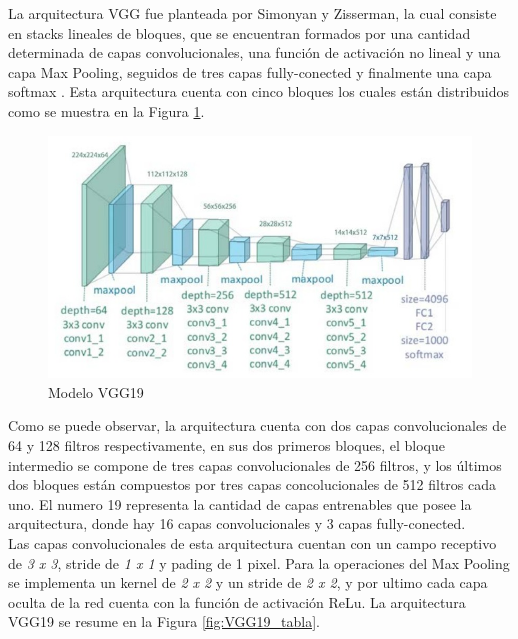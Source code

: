 				La arquitectura VGG fue planteada por Simonyan y Zisserman, la cual consiste en stacks lineales de bloques, que se encuentran formados por una cantidad determinada de capas convolucionales, una función de activación no lineal y una capa Max Pooling, seguidos de tres capas fully-conected y finalmente una capa softmax \cite{ref_2}. Esta arquitectura cuenta con cinco bloques los cuales están distribuidos como se muestra en la Figura \ref{fig:VGG19}.				
			
				\begin{figure}[ht]
					\centering
					\includegraphics[scale=0.45]{Figs/22.jpeg}
					\caption{Modelo VGG19}
					\label{fig:VGG19}
				\end{figure}			
				
				
				Como se puede observar, la arquitectura cuenta con dos capas convolucionales de 64 y 128 filtros respectivamente, en sus dos primeros bloques, el bloque intermedio se compone de tres capas convolucionales de 256 filtros, y los últimos dos bloques están compuestos por tres capas concolucionales de 512 filtros cada uno. El numero 19 representa la cantidad de capas entrenables que posee la arquitectura, donde hay 16 capas convolucionales y 3 capas fully-conected.\\			
					
				Las capas convolucionales de esta arquitectura cuentan con un campo receptivo de \textit{3 x 3}, stride de \textit{1 x 1} y pading de 1 pixel. Para la operaciones del Max Pooling se implementa un kernel de \textit{2 x 2} y un stride de \textit{2 x 2}, y por ultimo cada capa oculta de la red cuenta con la función de activación ReLu. La arquitectura VGG19 se resume en la Figura \ref{fig:VGG19_tabla}.
				
